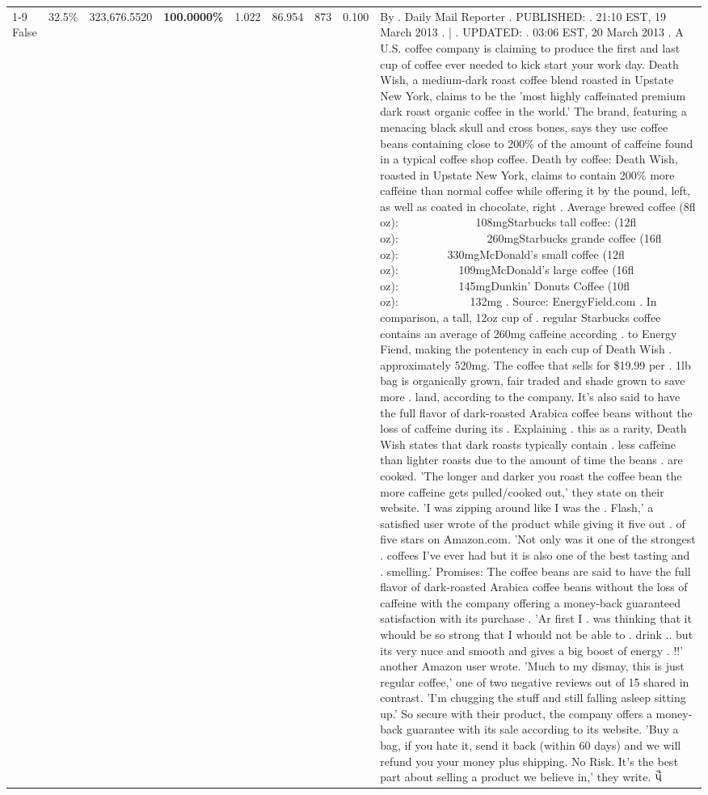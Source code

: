 \begin{table}[H]
{\begin{tabular}{lllrlllll}
\cline{1-9} \cline{2-9}
False & 32.5\% & 323,676.5520 & \bfseries \color{red} 100.0000\% & 1.022 & 86.954 & 873 & 0.100 & By . Daily Mail Reporter . PUBLISHED: . 21:10 EST, 19 March 2013 . | . UPDATED: . 03:06 EST, 20 March 2013 . A U.S. coffee company is claiming to produce the first and last cup of coffee ever needed to kick start your work day. Death Wish, a medium-dark roast coffee blend roasted in Upstate New York, claims to be the 'most highly caffeinated premium dark roast organic coffee in the world.' The brand, featuring a menacing black skull and cross bones, says they use coffee beans containing close to 200\% of the amount of caffeine found in a typical coffee shop coffee. Death by coffee: Death Wish, roasted in Upstate New York, claims to contain 200\% more caffeine than normal coffee while offering it by the pound, left, as well as coated in chocolate, right . Average brewed coffee (8fl oz):              108mgStarbucks tall coffee: (12fl oz):                260mgStarbucks grande coffee (16fl oz):         330mgMcDonald's small coffee (12fl oz):           109mgMcDonald's large coffee (16fl oz):           145mgDunkin' Donuts Coffee (10fl oz):             132mg . Source: EnergyField.com . In comparison, a tall, 12oz cup of . regular Starbucks coffee contains an average of 260mg caffeine according . to Energy Fiend, making the potentency in each cup of Death Wish . approximately 520mg. The coffee that sells for \$19.99 per . 1lb bag is organically grown, fair traded and shade grown to save more . land, according to the company. It's also said to have the full flavor of dark-roasted Arabica coffee beans without the loss of caffeine during its . Explaining . this as a rarity, Death Wish states that dark roasts typically contain . less caffeine than lighter roasts due to the amount of time the beans . are cooked. 'The longer and darker you roast the coffee bean the more caffeine gets pulled/cooked out,' they state on their website. 'I was zipping around like I was the . Flash,' a satisfied user wrote of the product while giving it five out . of five stars on Amazon.com. 'Not only was it one of the strongest . coffees I've ever had but it is also one of the best tasting and . smelling.’ Promises: The coffee beans are said to have the full flavor of dark-roasted Arabica coffee beans without the loss of caffeine with the company offering a money-back guaranteed satisfaction with its purchase . 'Ar first I . was thinking that it whould be so strong that I whould not be able to . drink .. but its very nuce and smooth and gives a big boost of energy . !!' another Amazon user wrote. 'Much to my dismay, this is just regular coffee,' one of two negative reviews out of 15 shared in contrast. 'I'm chugging the stuff and still falling asleep sitting up.' So secure with their product, the company offers a money-back guarantee with its sale according to its website. 'Buy a bag, if you hate it, send it back (within 60 days) and we will refund you your money plus shipping. No Risk. It’s the best part about selling a product we believe in,' they write. પૈ \\

\end{tabular}}
\end{table}
